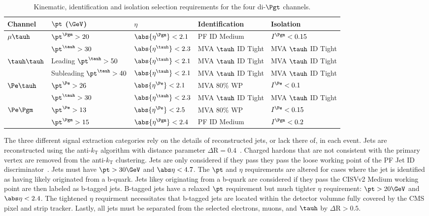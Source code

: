 \begin{table}[htbp]
\centering
\begin{small}
\begin{tabular}{l|l|l|l|l}
  Channel       & $\pt$ ($\GeV$) & $\eta$ & Identification & Isolation \\
\hline
  $\mu\tauh$       &   $\pt^\Pgm>20$     &  $\abs{\eta^\Pgm}<2.1$    &   PF ID Medium &  $I^{\Pgm}<0.15$       \\
                   &   $\pt^{\tauh}>30$  &  $\abs{\eta^{\tauh}}<2.3$ &   MVA $\tauh$ ID Tight & MVA $\tauh$ ID Tight \\
\hline
 $\tauh\tauh$      &   Leading $\pt^{\tauh}>50$ & $\abs{\eta^{\tauh}}<2.1$  &    MVA $\tauh$ ID Tight    & MVA $\tauh$ ID Tight    \\
                   &   Subleading $\pt^{\tauh}>40$ & $\abs{\eta^{\tauh}}<2.1$  &    MVA $\tauh$ ID Tight & MVA $\tauh$ ID Tight    \\
\hline
  $\Pe\tauh$       &   $\pt^\Pe>26$      & $\abs{\eta^\Pe}<2.1$       &   MVA 80\% WP  &  $I^{\Pe}<0.1$  \\
                   &   $\pt^{\tauh}>30$  &  $\abs{\eta^{\tauh}}<2.3$  &   MVA $\tauh$ ID Tight & MVA $\tauh$ ID Tight \\
\hline
  $\Pe\Pgm$        &   $\pt^{\Pe}>13$    & $\abs{\eta^\Pe}<2.5$   &   MVA 80\% WP   & $I^{\Pe}<0.15$   \\
                   &   $\pt^{\Pgm}>15$   & $\abs{\eta^\Pgm}<2.4$  & PF ID Medium &  $I^{\Pgm}<0.2$    \\
\hline
\end{tabular}
\end{small}
\caption{Kinematic, identification and isolation selection requirements for the four di-$\Pgt$ channels.
\label{tab:htt_obj_selection}
}
\end{table}


The three different signal extraction categories rely on the details of reconstructed jets, or
lack there of, in each event.  Jets are reconstructed using the anti-$k_{\text{T}}$ algorithm with distance
parameter $\Delta\text{R}=0.4$~\cite{Cacciari:2008gp}.  Charged hardons that are not consistent with
the primary vertex are removed from the anti-$k_{\text{T}}$ clustering.  Jets are only considered
if they pass they pass the loose working point of the PF Jet ID discriminator~\cite{jetID}.
Jets must have $\pt > 30 \GeV$ and $\abs\eta<4.7$.  The $\pt$ and $\eta$ requirements are altered
for cases where the jet is identified as having likely originated from a b-quark.  Jets likey originating
from a b-quark are considered if they pass the CISVv2 Medium working point are then labeled as b-tagged jets.
B-tagged jets have a relaxed $\pt$ requirement but much tighter $\eta$ requirement: $\pt > 20 \GeV$ 
and $\abs\eta<2.4$.  The tightened $\eta$ requirment necessitates that b-tagged jets are located within
the detector volumne fully covered by the CMS pixel and strip tracker.
Lastly, all jets must be separated from the selected electrons, muons, and $\tauh$ by $\Delta\text{R}>0.5$.

